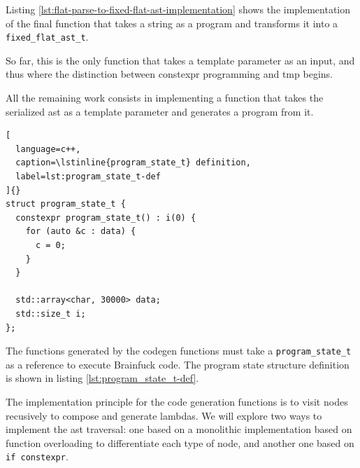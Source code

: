 \documentclass[../main]{subfiles}
\begin{document}
Listing \ref{lst:flat-parse-to-fixed-flat-ast-implementation} shows the
implementation of the final function that takes a string as a program
and transforms it into a \lstinline{fixed_flat_ast_t}.

So far, this is the only function that takes a template parameter as an input,
and thus where the distinction between \gls{constexpr} programming and \gls{tmp}
begins.

All the remaining work consists in implementing a function that takes the
serialized \gls{ast} as a template parameter and generates a program from it.

\begin{lstlisting}[
  language=c++,
  caption=\lstinline{program_state_t} definition,
  label=lst:program_state_t-def
]{}
struct program_state_t {
  constexpr program_state_t() : i(0) {
    for (auto &c : data) {
      c = 0;
    }
  }

  std::array<char, 30000> data;
  std::size_t i;
};
\end{lstlisting}

The functions generated by the codegen functions must take a
\lstinline{program_state_t} as a reference to execute Brainfuck code.
The program state structure definition is shown in listing
\ref{lst:program_state_t-def}.

The implementation principle for the code generation functions is to visit
nodes recusively to compose and generate lambdas.
We will explore two ways to implement the \gls{ast} traversal:
one based on a monolithic implementation based on function overloading
to differentiate each type of node, and another one based on
\lstinline{if constexpr}.
\end{document}
